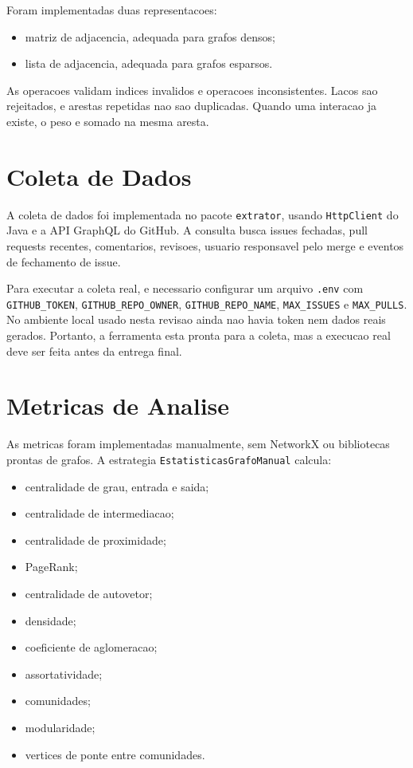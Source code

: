 \documentclass[12pt]{article}
\begin{document}
Foram implementadas duas representacoes:

\begin{itemize}
  \item matriz de adjacencia, adequada para grafos densos;
  \item lista de adjacencia, adequada para grafos esparsos.
\end{itemize}

As operacoes validam indices invalidos e operacoes inconsistentes. Lacos sao
rejeitados, e arestas repetidas nao sao duplicadas. Quando uma interacao ja
existe, o peso e somado na mesma aresta.

\section{Coleta de Dados}

A coleta de dados foi implementada no pacote \texttt{extrator}, usando
\texttt{HttpClient} do Java e a API GraphQL do GitHub. A consulta busca issues
fechadas, pull requests recentes, comentarios, revisoes, usuario responsavel
pelo merge e eventos de fechamento de issue.

Para executar a coleta real, e necessario configurar um arquivo \texttt{.env}
com \texttt{GITHUB\_TOKEN}, \texttt{GITHUB\_REPO\_OWNER},
\texttt{GITHUB\_REPO\_NAME}, \texttt{MAX\_ISSUES} e \texttt{MAX\_PULLS}. No
ambiente local usado nesta revisao ainda nao havia token nem dados reais
gerados. Portanto, a ferramenta esta pronta para a coleta, mas a execucao real
deve ser feita antes da entrega final.

\section{Metricas de Analise}

As metricas foram implementadas manualmente, sem NetworkX ou bibliotecas
prontas de grafos. A estrategia \texttt{EstatisticasGrafoManual} calcula:

\begin{itemize}
  \item centralidade de grau, entrada e saida;
  \item centralidade de intermediacao;
  \item centralidade de proximidade;
  \item PageRank;
  \item centralidade de autovetor;
  \item densidade;
  \item coeficiente de aglomeracao;
  \item assortatividade;
  \item comunidades;
  \item modularidade;
  \item vertices de ponte entre comunidades.
\end{itemize}
\end{document}
